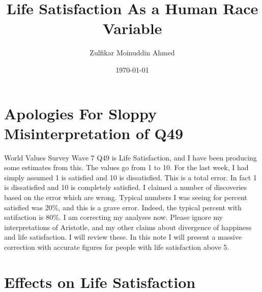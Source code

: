\documentclass{amsart}
\title{Life Satisfaction As a Human Race Variable}
\author{Zulfikar Moinuddin Ahmed}
\date{\today}
\begin{document}
\maketitle


\section{Apologies For Sloppy Misinterpretation of Q49}

World Values Survey Wave 7 Q49 is Life Satisfaction, and I have been producing some estimates from this.  The values go from 1 to 10.  For the last week, I had simply assumed 1 is satisfied and 10 is dissatisfied.  This is a total error.  In fact 1 is dissatisfied and 10 is completely satisfied.  I claimed a number of discoveries based on the error which are wrong.  Typical numbers I was seeing for percent satisfied was 20\%, and this is a grave error.  Indeed, the typical percent with satifaction is 80\%. I am correcting my analyses now.  Please ignore my interpretations of Aristotle, and my other claims about divergence of happiness and life satisfaction.  I will review these.  In this note I will present a massive correction with accurate figures for people with life satisfaction above 5.

\section{Effects on Life Satisfaction}
\end{document}
